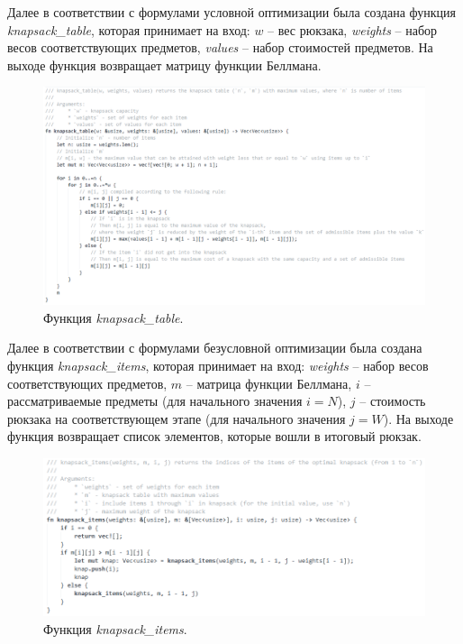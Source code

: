 Далее в соответствии с формулами условной оптимизации была создана функция \textit{knapsack\_table}, которая принимает на вход: $w$ -- вес рюкзака, \textit{weights} -- набор весов соответствующих предметов, \textit{values} -- набор стоимостей предметов. На выходе функция возвращает матрицу функции Беллмана.
\begin{figure}[h]
  \centering \includegraphics[scale=0.6]{content/images/impl_knapsack5.png}
  \caption{Функция \textit{knapsack\_table}.}
  \label{fig:impl_knapsack5}
\end{figure}

Далее в соответствии с формулами безусловной оптимизации была создана функция \textit{knapsack\_items}, которая принимает на вход: \textit{weights} -- набор весов соответствующих предметов, $m$ -- матрица функции Беллмана, $i$ -- рассматриваемые предметы (для начального значения $i=N$), $j$ -- стоимость рюкзака на соответствующем этапе (для начального значения $j=W$). На выходе функция возвращает список элементов, которые вошли в итоговый рюкзак.
\begin{figure}[h]
  \centering \includegraphics[scale=0.6]{content/images/impl_knapsack6.png}
  \caption{Функция \textit{knapsack\_items}.}
  \label{fig:impl_knapsack6}
\end{figure}

